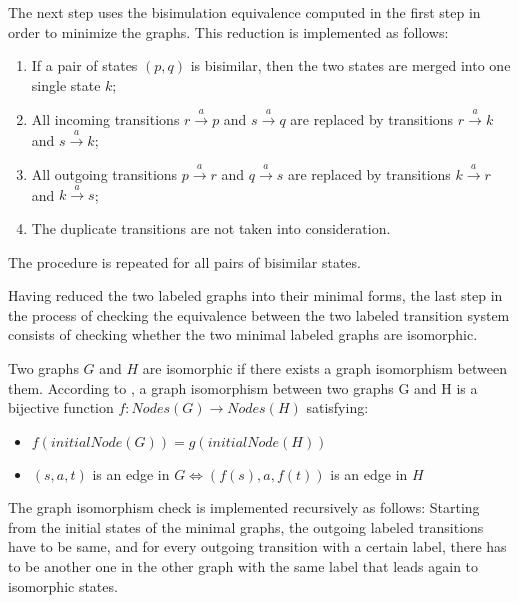 

The next step uses the bisimulation equivalence computed in the first step in order to minimize the graphs. This reduction 
is implemented as follows:
\begin{enumerate}
	\item If a pair of states $(p, q)$ is bisimilar, then the two states are merged into one single state $k$;
	\item All incoming transitions $r \stackrel{a}{\rightarrow} p$ and $s \stackrel{a}{\rightarrow} q$ are replaced by transitions $r \stackrel{a}{\rightarrow} k$ and $s \stackrel{a}{\rightarrow} k$;
	\item All outgoing transitions $p \stackrel{a}{\rightarrow} r$ and $q \stackrel{a}{\rightarrow} s$ are replaced by transitions $k \stackrel{a}{\rightarrow} r$ and $k \stackrel{a}{\rightarrow} s$;
	\item The duplicate transitions are not taken into consideration.
\end{enumerate}
The procedure is repeated for all pairs of bisimilar states.

Having reduced the two labeled graphs into their minimal forms, the last step in the process of checking the equivalence
between the two labeled transition system consists of checking whether the two minimal labeled graphs are isomorphic.

Two graphs $G$ and $H$ are isomorphic if there exists a graph isomorphism between them. According to \cite{HandbookProcessAlgebra}, 
a graph isomorphism between two graphs G and H is a bijective function $f: Nodes(G) \rightarrow Nodes(H)$ satisfying:
\begin{itemize}
	\item $f(initialNode(G)) = g(initialNode(H))$
	\item $(s, a, t)$ is an edge in $G \Leftrightarrow (f(s), a, f(t))$ is an edge in $H$
\end{itemize}

The graph isomorphism check is implemented recursively as follows:
Starting from the initial states of the minimal graphs, the outgoing labeled transitions have to be same, and for every outgoing
transition with a certain label, there has to be another one in the other graph with the same label that leads again to isomorphic
states. 

